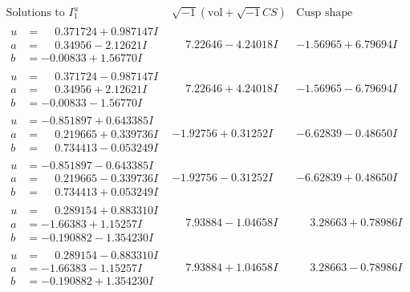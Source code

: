 \documentclass[1p]{elsarticle_modified}
\theoremstyle{definition}
\newcommand{\I}{\sqrt{-1}}
\begin{document}
$$\begin{array}{c|c|c}  
\text{Solutions to }I^u_{1}& \I (\text{vol} + \sqrt{-1}CS) & \text{Cusp shape}\\
 \hline 
\begin{aligned}
u &= \phantom{-}0.371724 + 0.987147 I \\
a &= \phantom{-}0.34956 - 2.12621 I \\
b &= -0.00833 + 1.56770 I\end{aligned}
 & \phantom{-}7.22646 - 4.24018 I & -1.56965 + 6.79694 I \\ \hline\begin{aligned}
u &= \phantom{-}0.371724 - 0.987147 I \\
a &= \phantom{-}0.34956 + 2.12621 I \\
b &= -0.00833 - 1.56770 I\end{aligned}
 & \phantom{-}7.22646 + 4.24018 I & -1.56965 - 6.79694 I \\ \hline\begin{aligned}
u &= -0.851897 + 0.643385 I \\
a &= \phantom{-}0.219665 + 0.339736 I \\
b &= \phantom{-}0.734413 - 0.053249 I\end{aligned}
 & -1.92756 + 0.31252 I & -6.62839 - 0.48650 I \\ \hline\begin{aligned}
u &= -0.851897 - 0.643385 I \\
a &= \phantom{-}0.219665 - 0.339736 I \\
b &= \phantom{-}0.734413 + 0.053249 I\end{aligned}
 & -1.92756 - 0.31252 I & -6.62839 + 0.48650 I \\ \hline\begin{aligned}
u &= \phantom{-}0.289154 + 0.883310 I \\
a &= -1.66383 + 1.15257 I \\
b &= -0.190882 - 1.354230 I\end{aligned}
 & \phantom{-}7.93884 - 1.04658 I & \phantom{-}3.28663 + 0.78986 I \\ \hline\begin{aligned}
u &= \phantom{-}0.289154 - 0.883310 I \\
a &= -1.66383 - 1.15257 I \\
b &= -0.190882 + 1.354230 I\end{aligned}
 & \phantom{-}7.93884 + 1.04658 I & \phantom{-}3.28663 - 0.78986 I \\ \hline\begin{aligned}

\end{aligned}
\end{array}$$
\end{document}
